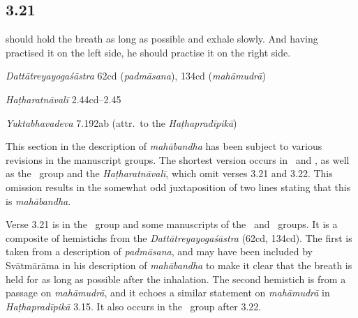 \begin{ekdosis}
\subsection*{3.21}
\begin{translation} should hold the breath as long as possible and exhale slowly. And having practised it on the left side, he should practise it on the right side. 
\end{translation}

\begin{sources}[hp03_021]
\emph{Dattātreyayogaśāstra} 62cd (\emph{padmāsana}), 134cd (\emph{mahāmudrā})
\begin{versinnote}
\end{versinnote}
\end{sources}

\begin{testimonia}[hp03_021]
\emph{Haṭharatnāvalī} 2.44cd–2.45
\begin{versinnote}
\end{versinnote}

\emph{Yuktabhavadeva} 7.192ab (attr.~to the \emph{Haṭhapradīpikā})
\begin{versinnote}
\end{versinnote}
\end{testimonia}

\begin{philcomm}[hp03_021]
This section in the description of \emph{mahābandha} has been subject to various revisions in the manuscript groups. The shortest version occurs in \alphaOne\ and \alphaTwo, as well as the \textbeta\ group and the \emph{Haṭharatnāvalī}, which omit verses 3.21 and 3.22. This omission results in the somewhat odd juxtaposition of two lines stating that this is \emph{mahābandha}. 

Verse 3.21 is in the \textgamma\ group and some manuscripts of the \textbeta\ and \texteta\ groups. It is a composite of hemistichs from the \emph{Dattātreyayogaśāstra} (62cd, 134cd). The first is taken from a description of \emph{padmāsana}, and may have been included by Svātmārāma in his description of \emph{mahābandha} to make it clear that the breath is held for as long as possible after the inhalation. The second hemistich is from a passage on \emph{mahāmudrā}, and it echoes a similar statement on \emph{mahāmudrā} in \emph{Haṭhapradīpikā} 3.15. It also occurs in the \textalpha\ group after 3.22.
\end{philcomm}


\end{ekdosis}
